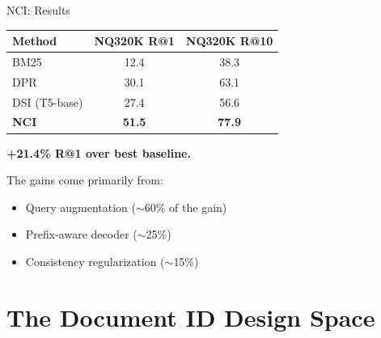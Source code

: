 \documentclass[aspectratio=169,11pt]{beamer}
\begin{document}
\begin{frame}{NCI: Results}
\begin{center}
\begin{tabular}{lcc}
\toprule
\textbf{Method} & \textbf{NQ320K R@1} & \textbf{NQ320K R@10} \\
\midrule
BM25 & 12.4 & 38.3 \\
DPR & 30.1 & 63.1 \\
DSI (T5-base) & 27.4 & 56.6 \\
\textbf{NCI} & \textbf{51.5} & \textbf{77.9} \\
\bottomrule
\end{tabular}
\end{center}

\vspace{0.4cm}
\textbf{+21.4\% R@1 over best baseline.}

\vspace{0.3cm}
The gains come primarily from:
\begin{itemize}
    \item Query augmentation ($\sim$60\% of the gain)
    \item Prefix-aware decoder ($\sim$25\%)
    \item Consistency regularization ($\sim$15\%)
\end{itemize}
\end{frame}


\section{The Document ID Design Space}
\end{document}
